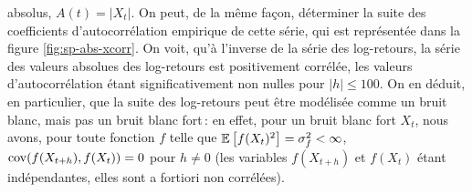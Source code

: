 absolus, $A(t) = |X_{t}|$. On peut, de la m\^{e}me fa\c{c}on,
d\'eterminer la suite des coefficients d'autocorr\'elation empirique
de cette s\'erie, qui est repr\'esent\'ee dans la figure
\ref{fig:sp-abs-xcorr}. On voit, qu'\`a l'inverse de la s\'erie des
log-retours, la s\'erie des valeurs absolues des log-retours est
positivement corr\'el\'ee, les valeurs d'autocorr\'elation \'etant
significativement non nulles pour $|h| \leq 100$. On en d\'eduit, en
particulier, que la suite des log-retours peut \^{e}tre mod\'elis\'ee
comme un bruit blanc, mais pas un bruit blanc fort\,: en effet,
pour un bruit blanc fort $X_{t}$, nous avons, pour toute fonction
$f$ telle que ${\mathbb E}\left[ f(X_{t})^2 \right] = \sigma_f^2 < \infty$,
$\mathrm{cov}(f(X_{t+h}),f(X_{t}))= 0$ pour $h\neq 0$ (les variables
$f(X_{t+h})$ et $f(X_{t})$ \'etant ind\'ependantes, elles sont a
fortiori non corr\'el\'ees).
